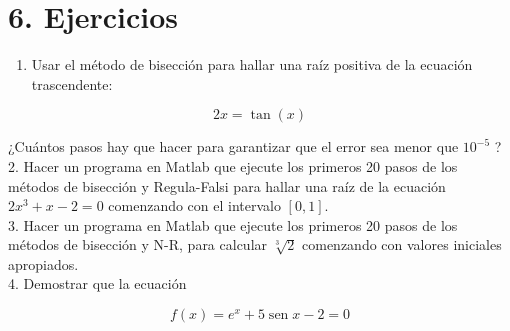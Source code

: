 \documentclass[10pt]{article}
\begin{document}
\section*{6. Ejercicios}
\begin{enumerate}
  \item Usar el método de bisección para hallar una raíz positiva de la ecuación trascendente:
\end{enumerate}

$$
2 x=\tan (x)
$$

¿Cuántos pasos hay que hacer para garantizar que el error sea menor que $10^{-5}$ ?\\
2. Hacer un programa en Matlab que ejecute los primeros 20 pasos de los métodos de bisección y Regula-Falsi para hallar una raíz de la ecuación $2 x^{3}+x-2=0$ comenzando con el intervalo $[0,1]$.\\
3. Hacer un programa en Matlab que ejecute los primeros 20 pasos de los métodos de bisección y N-R, para calcular $\sqrt[3]{2}$ comenzando con valores iniciales apropiados.\\
4. Demostrar que la ecuación

$$
f(x)=e^{x}+5 \operatorname{sen} x-2=0
$$
\end{document}
